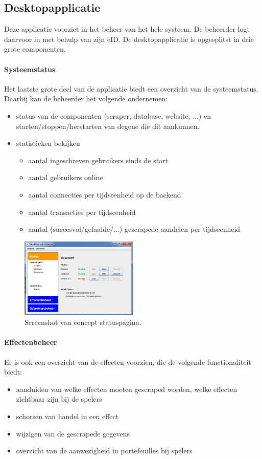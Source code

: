 \subsection{Desktopapplicatie}
Deze applicatie voorziet in het beheer van het hele systeem. De beheerder logt daarvoor in met behulp van zijn eID.
De desktopapplicatie is opgesplitst in drie grote componenten.

\paragraph{Systeemstatus}Het laatste grote deel van de applicatie biedt een overzicht van de systeemstatus. Daarbij kan de beheerder het volgende ondernemen:
\begin{itemize}
\item{status van de componenten (scraper, database, website, ...) en starten/stoppen/herstarten van degene die dit aankunnen.}
\item{statistieken bekijken}
	\begin{itemize}
	\item{aantal ingeschreven gebruikers sinds de start}
	\item{aantal gebruikers online}
	\item{aantal connecties per tijdseenheid op de backend}
	\item{aantal transacties per tijdseenheid}
	\item{aantal (succesvol/gefaalde/...) gescrapede aandelen per tijdseenheid}
	\end{itemize}
\end{itemize}

\begin{figure}[h!]
	\centering
		\includegraphics[width=0.5\textwidth]{images/ontwerp/screenshot_app_status}
	\caption{Screenshot van concept statuspagina.}
\end{figure}

\paragraph{Effectenbeheer}Er is ook een overzicht van de effecten voorzien, die de volgende functionaliteit biedt:
\begin{itemize}
	\item{aanduiden van welke effecten moeten gescraped worden, welke effecten zichtbaar zijn bij de spelers}
	\item{schorsen van handel in een effect}
	\item{wijzigen van de gescrapede gegevens}
	\item{overzicht van de aanwezigheid in portefeuilles bij spelers}
\end{itemize}

